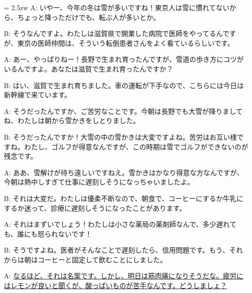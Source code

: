 \documentclass[11pt]{amsart}
\title{}
\author{}
\newenvironment{hangall}[1]{\hangindent = 2.5zw\everypar{\hangindent = 2.5zw}}{}
\begin{document}
\maketitle
\begin{hangall}{}%
A: いやー、今年の冬は雪が多いですね！東京人は雪に慣れてないから、ちょっと降っただけでも、転ぶ人が多いとか。

B: そうなんですよ。わたしは滋賀県で開業した病院で医師をやってるんですが、東京の医師仲間は、そういう転倒患者さんをよく看ているらしいです。

A: あー、やっぱりねー！長野で生まれ育ったんですが、雪道の歩き方にコツがいるんですよ。あなたは滋賀で生まれ育ったんですか？

B: はい、滋賀で生まれ育ちました。車の運転が下手なので、こちらには今日は新幹線で来ています。

A: そうだったんですか、ご苦労なことです。今朝は長野でも大雪が降りましてね、わたしは朝から雪かきをしとりました。

B: そうだったんですか！大雪の中の雪かきは大変ですよね。苦労はお互い様ですね。わたし、ゴルフが得意なんですが、この時期は雪でゴルフができないのが残念です。

A: ああ、雪解けが待ち遠しいですねえ。雪かきはかなり得意な方なんですが、今朝は熱中しすぎて仕事に遅刻しそうになっちゃいましたよ。

B: それは大変だ。わたしは優柔不断なので、朝食で、コーヒーにするか牛乳にするか迷って、診療に遅刻しそうになったことがあります。

A: それはまずいでしょう！わたしは小さな薬局の薬剤師なんで、多少遅れても、誰にも怒られないです！

B: そうですよね。医者がそんなことで遅刻したら、信用問題です。もう、それからは朝はコーヒーと固定して飲むことにしました。

A: \ul{なるほど、それは名案です。しかし、明日は筋肉痛になりそうだな。疲労にはレモンが良いと聞くが、酸っぱいものが苦手なんです。どうしましょ？}\end{hangall}
\end{document}
